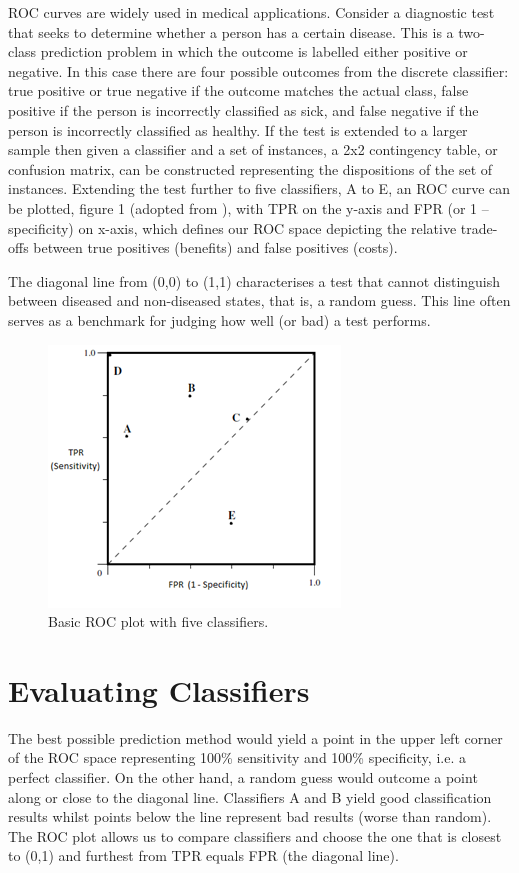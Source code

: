 ROC curves are widely used in medical applications. Consider a diagnostic test that seeks to determine whether a person has a certain disease. This is a two-class prediction problem in which the outcome is labelled either positive or negative. In this case there are four possible outcomes from the discrete classifier: true positive or true negative if the outcome matches the actual class, false positive if the person is incorrectly classified as sick, and false negative if the person is incorrectly classified as healthy. If the test is extended to a larger sample then given a classifier and a set of instances, a 2x2 contingency table, or confusion matrix, can be constructed representing the dispositions of the set of instances. Extending the test further to five classifiers, A to E, an ROC curve can be plotted, figure 1 (adopted from \citep{fawcett2006introroc}), with TPR on the y-axis and FPR (or 1 – specificity) on x-axis, which defines our ROC space depicting the relative trade-offs between true positives (benefits) and false positives (costs). 

The diagonal line from (0,0) to (1,1) characterises a test that cannot distinguish between diseased and non-diseased states, that is, a random guess. This line often serves as a benchmark for judging how well (or bad) a test performs.

\begin{figure}
	\includegraphics{roc_curves/Figure1.png}
	\caption{Basic ROC plot with five classifiers.}
	\label{fig:classifiers-roc}
\end{figure}

\section{Evaluating Classifiers} 
The best possible prediction method would yield a point in the upper left corner of the ROC space representing 100\% sensitivity and 100\% specificity, i.e. a perfect classifier. On the other hand, a random guess would outcome a point along or close to the diagonal line. Classifiers A and B yield good classification results whilst points below the line represent bad results (worse than random). The ROC plot allows us to compare classifiers and choose the one that is closest to (0,1) and furthest from TPR equals FPR (the diagonal line).


